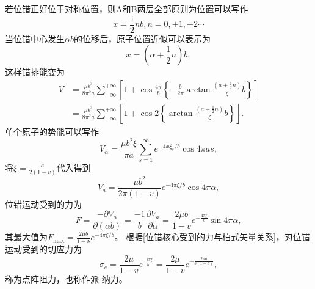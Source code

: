                 若位错正好位于对称位置，则A和B两层全部原则为位置可以写作
                \begin{equation}
                    x=\frac{1}{2}nb,n=0,\pm1,\pm2\cdots
                \end{equation}
                当位错中心发生$\alpha b$的位移后，原子位置近似可以表示为
                \begin{equation}
                    x=\left( \alpha+\frac{1}{2}n \right)b,
                \end{equation}
                这样错排能变为
                \begin{equation}
                    \begin{aligned}
                        V&=\frac{\mu b^{3}}{8 \pi^{2} a} \sum_{-\infty}^{+\infty}\left[1+\cos \frac{4 \pi}{b}\left\{-\frac{b}{2 \pi} \arctan \frac{\left(a+\frac{1}{2} n\right)}{\xi} b\right\}\right] \\
                        &=\frac{\mu b^{3}}{8 \pi^{2} a} \sum_{-\infty}^{+\infty}\left[1+\cos 2\left\{\arctan \frac{\left(a+\frac{1}{2} n\right)}{\zeta} b\right\}\right].
                    \end{aligned}
                \end{equation}
                单个原子的势能可以写作
                \begin{equation}
                    V_{\alpha}=\frac{\mu b^{2} \xi}{\pi a} \sum_{s=1}^{\infty} e^{-4 x \xi_{s} / b} \cos 4 \pi a s,
                \end{equation}
                将$\xi=\frac{a}{2(1-v)}$代入得到
                \begin{equation}
                    V_{a}=\frac{\mu b^{2}}{2 \pi(1-v)} e^{-4 \pi \xi / b} \cos 4 \pi \alpha,
                \end{equation}
                位错运动受到的力为
                \begin{equation}
                    F=\frac{-\partial V_\alpha}{\partial(\alpha b)}=\frac{-1}{b}\frac{\partial V_a}{\partial\alpha}=\frac{2\mu b}{1-v}e^{-\frac{4\pi\xi}{b}}\sin{4\pi\alpha},
                \end{equation}
                其最大值为$F_{\mathrm{max}}=\frac{2 \mu b}{1-\nu} e^{-4 \pi \xi / b}$。
                根据\autoref{位错核心受到的力与柏式矢量关系}，刃位错运动受到的切应力为
                \begin{equation}
                    \sigma_{e}=\frac{2 \mu}{1-v} e^{\frac{-i \pi \xi} { b}}=\frac{2 \mu}{1-v} e^{ -\frac{2 \pi a}{b(1-v)}},
                \end{equation}
                称为点阵阻力，也称作派-纳力。
